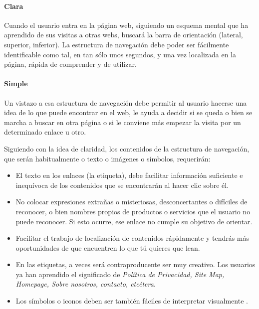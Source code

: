 		\paragraph{Clara} %
		\label{par:nav_clara}
			Cuando el usuario entra en la página web, siguiendo un esquema mental que ha aprendido de sus visitas a otras webs, buscará la barra de orientación (lateral, superior, inferior).
			La estructura de navegación debe poder ser fácilmente identificable como tal, en tan sólo unos segundos, y una vez localizada en la página, rápida de comprender y de utilizar.
		
		\paragraph{Simple} %
		\label{par:nav_simple}
			Un vistazo a esa estructura de navegación debe permitir al usuario hacerse una idea de lo que puede encontrar en el web, le ayuda a decidir si se queda o bien se marcha a buscar en otra página o si le conviene más empezar la visita por un determinado enlace u otro.
			
		
		
		Siguiendo con la idea de claridad, los contenidos de la estructura de navegación, que serán habitualmente o texto o imágenes o símbolos, requerirán:
		\begin{itemize}
			\item El texto en los enlaces (la etiqueta), debe facilitar información suficiente e inequívoca de los contenidos que se encontrarán al hacer clic sobre él.
			\item No colocar expresiones extrañas o misteriosas, desconcertantes o difíciles de reconocer, o bien nombres propios de productos o servicios que el usuario no puede reconocer. Si esto ocurre, ese enlace no cumple su objetivo de orientar.
			\item Facilitar el trabajo de localización de contenidos rápidamente y tendrás más oportunidades de que encuentren lo que tú quieres que lean.
			\item En las etiquetas, a veces será contraproducente ser muy creativo. Los usuarios ya han aprendido el significado de \textit{Política de Privacidad, Site Map, Homepage, Sobre nosotros, contacto, etcétera}. 
			\item Los símbolos o iconos deben ser también fáciles de interpretar visualmente .
		\end{itemize}
		
